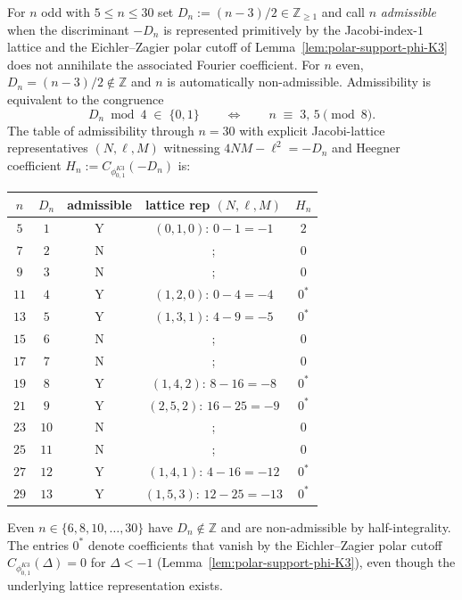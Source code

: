 \begin{proposition}
\label{prop:admissibility-table}
For $n$ odd with $5 \le n \le 30$ set $D_n := (n-3)/2 \in \mathbb{Z}_{\ge 1}$
and call $n$ \emph{admissible} when the discriminant $-D_n$ is represented
primitively by the Jacobi-index-$1$ lattice and the Eichler--Zagier polar
cutoff of Lemma~\ref{lem:polar-support-phi-K3} does not annihilate the
associated Fourier coefficient. For $n$ even, $D_n = (n-3)/2 \notin
\mathbb{Z}$ and $n$ is automatically non-admissible. Admissibility is
equivalent to the congruence
\[
 D_n \bmod 4 \;\in\; \{0, 1\}
 \qquad\Longleftrightarrow\qquad
 n \;\equiv\; 3,\,5 \pmod 8.
\]
The table of admissibility through $n = 30$ with explicit Jacobi-lattice
representatives $(N, \ell, M)$ witnessing $4NM - \ell^2 = -D_n$ and
Heegner coefficient $H_n := C_{\phi^{K3}_{0,1}}(-D_n)$ is:
\begin{center}
\renewcommand{\arraystretch}{1.15}
\begin{tabular}{c|c|c|c|c}
$n$ & $D_n$ & admissible & lattice rep $(N, \ell, M)$ & $H_n$ \\
\hline
$5$ & $1$ & Y & $(0, 1, 0)$: $0 - 1 = -1$ & $2$ \\
$7$ & $2$ & N &; & $0$ \\
$9$ & $3$ & N &; & $0$ \\
$11$ & $4$ & Y & $(1, 2, 0)$: $0 - 4 = -4$ & $0^*$ \\
$13$ & $5$ & Y & $(1, 3, 1)$: $4 - 9 = -5$ & $0^*$ \\
$15$ & $6$ & N &; & $0$ \\
$17$ & $7$ & N &; & $0$ \\
$19$ & $8$ & Y & $(1, 4, 2)$: $8 - 16 = -8$ & $0^*$ \\
$21$ & $9$ & Y & $(2, 5, 2)$: $16 - 25 = -9$ & $0^*$ \\
$23$ & $10$ & N &; & $0$ \\
$25$ & $11$ & N &; & $0$ \\
$27$ & $12$ & Y & $(1, 4, 1)$: $4 - 16 = -12$ & $0^*$ \\
$29$ & $13$ & Y & $(1, 5, 3)$: $12 - 25 = -13$ & $0^*$ \\
\end{tabular}
\end{center}
Even $n\in\{6, 8, 10, \ldots, 30\}$ have $D_n\notin\mathbb{Z}$ and are
non-admissible by half-integrality. The entries $0^*$ denote coefficients
that vanish by the Eichler--Zagier polar cutoff
$C_{\phi^{K3}_{0,1}}(\Delta) = 0$ for $\Delta < -1$
(Lemma~\ref{lem:polar-support-phi-K3}), even though the underlying
lattice representation exists.
\end{proposition}

